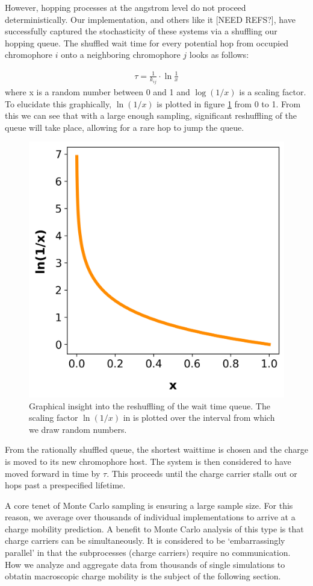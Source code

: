 However, hopping processes at the angstrom level do not proceed deterministically. 
Our implementation, and others like it [NEED REFS?], have
successfully captured the stochasticity of these systems via a shuffling our hopping queue.
The shuffled wait time for every potential hop from occupied chromophore $i$ onto a
neighboring chromophore $j$ looks as follows:

\begin{align}
    \tau = \frac{1}{k_{ij}} \cdot \ln{\frac{1}{x}} 
    \label{waittime}
\end{align}
where x is a random number between 0 and 1 and $\log{(1/x)}$ is a scaling
factor. To elucidate this
graphically, $\ln{(1/x)}$ is plotted in figure \ref{fig:ln} from 0 to 1. From this we can see that with
a large enough sampling, significant reshuffling of the queue will take place, allowing for a rare hop to jump
the queue.

\begin{figure}
  \center
  \includegraphics[width=0.5\linewidth]{figures/naturallog.png}
  \caption{Graphical insight into the reshuffling of the wait time queue. The
    scaling factor $\ln{(1/x)}$ in \label{waittime} is plotted over the
    interval from which we draw random numbers. }
  \label{fig:ln}
\end{figure}

From the rationally shuffled queue, the shortest waittime is chosen and the charge is moved to
its new chromophore host. The system is then considered to have moved forward in time by $\tau$. This proceeds
until the charge carrier stalls out or hops past a prespecified lifetime. 


A core tenet of Monte Carlo sampling is ensuring a large sample size. For this reason, we average over
thousands of individual  implementations to arrive at a charge mobility prediction. 
A benefit to Monte Carlo analysis of this type is that charge carriers can be simultaneously. It is considered
to be `embarrassingly parallel' in that the subprocesses (charge carriers) require no communication.
How we analyze and aggregate data from thousands of
single  simulations to obtatin macroscopic charge mobility is the subject of the following section.



